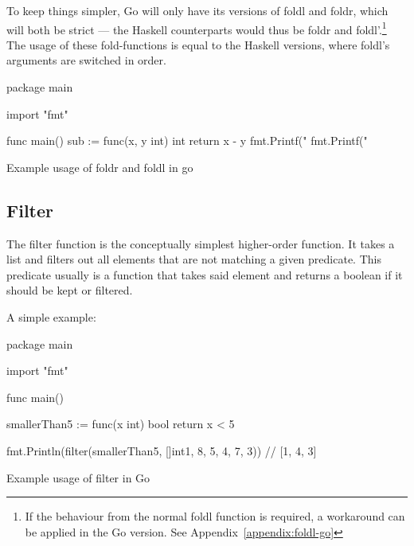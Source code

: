 To keep things simpler, Go will only have its versions of foldl and foldr, which
will both be strict --- the Haskell counterparts would thus be foldr and foldl'.\footnote{
If the behaviour from the normal foldl function is required, a workaround can
be applied in the Go version. See Appendix~\ref{appendix:foldl-go}}
The usage of these fold-functions is equal to the Haskell versions, where foldl's
arguments are switched in order.

\begin{listing}
\begin{gocode}
package main

import "fmt"

func main() {
  sub := func(x, y int) int { return x - y }
  fmt.Printf("%
  fmt.Printf("%
}
\end{gocode}
    \caption{Example usage of foldr and foldl in go}\label{code:fold-go}
\end{listing}
\subsection{Filter}

The filter function is the conceptually simplest higher-order function.
It takes a list and filters out all elements that are not matching
a given predicate.
This predicate usually is a function that takes said element and returns
a boolean if it should be kept or filtered.

A simple example:

\begin{listing}
    \begin{gocode}
package main

import "fmt"

func main() {
  smallerThan5 := func(x int) bool {
    return x < 5
  }

  fmt.Println(filter(smallerThan5, []int{1, 8, 5, 4, 7, 3})) // [1, 4, 3]
}
\end{gocode}
    \caption{Example usage of filter in Go}\label{code:filter-go}
\end{listing}
